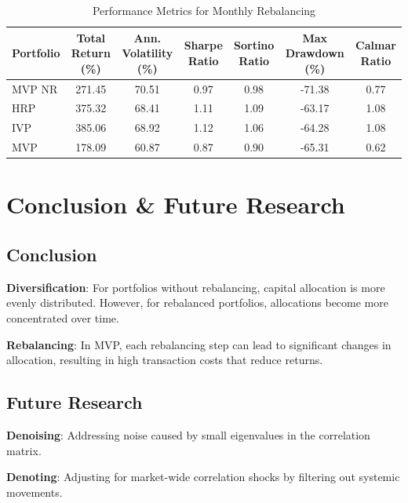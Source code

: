 \documentclass[english]{maciarticle}
\begin{document}
\vspace{-0.5cm}

\begin{table}[H]
    \centering
    \renewcommand{\arraystretch}{1.1}
    \small %
    \caption{Performance Metrics for Monthly Rebalancing}
    \begin{tabular}{|l|c|c|c|c|c|c|}
    \hline
    Portfolio & Total Return (\%) & Ann. Volatility (\%) & Sharpe Ratio & Sortino Ratio & Max Drawdown (\%) & Calmar Ratio \\
    \hline
    MVP NR & 271.45 & 70.51 & 0.97 & 0.98 & -71.38 & 0.77 \\
    HRP & 375.32 & 68.41 & 1.11 & 1.09 & -63.17 & 1.08 \\
    IVP & 385.06 & 68.92 & 1.12 & 1.06 & -64.28 & 1.08 \\
    MVP & 178.09 & 60.87 & 0.87 & 0.90 & -65.31 & 0.62 \\
    \hline
    \end{tabular}
\end{table}

\section{Conclusion \& Future Research}

\subsection{Conclusion}

\textbf{Diversification}: For portfolios without rebalancing, capital allocation is more evenly distributed. However, for rebalanced portfolios, allocations become more concentrated over time.

\textbf{Rebalancing}: In MVP, each rebalancing step can lead to significant changes in allocation, resulting in high transaction costs that reduce returns.

\subsection{Future Research}

\textbf{Denoising}: Addressing noise caused by small eigenvalues in the correlation matrix.

\textbf{Denoting}: Adjusting for market-wide correlation shocks by filtering out systemic movements.

\end{document}
